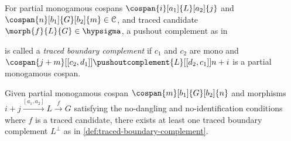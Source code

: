 \begin{definition}
    \label{def:traced-boundary-complement}
    For partial monogamous cospans \(
        \cospan{i}[a_1]{L}[a_2]{j}
    \) and \(
        \cospan{n}[b_1]{G}[b_2]{m} \in \mathcal{C}
    \), and traced candidate \(
        \morph{f}{L}{G} \in \hypsigma
    \), a pushout complement as in
    \begin{center}
        
    \end{center}
    is called a \emph{traced boundary complement} if \(c_1\) and \(c_2\) are
    mono and \(
        \cospan{j+m}[[c_2,d_1]]{\pushoutcomplement{L}}[[d_2,c_1]]{{n+i}}
    \) is a partial monogamous cospan.
\end{definition}

\begin{lemma}
    \label{lem:traced-boundary-complement-exists}
    Given partial monogamous cospan \(\cospan{m}[b_1]{G}[b_2]{n}\) and morphisms
    \(
        i + j \xrightarrow{[a_1, a_2]} L \xrightarrow{f} G
    \) satisfying the no-dangling and no-identification conditions where \(f\)
    is a traced candidate, there exists at least one traced boundary complement
    \(L^\bot\) as in \cref{def:traced-boundary-complement}.
\end{lemma}
